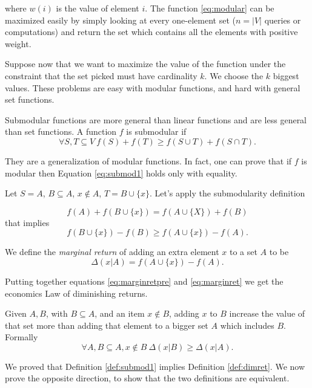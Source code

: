 where $w(i)$ is the value of element $i$. The function \ref{eq:modular} can be maximized easily by simply looking at every one-element set ($n = |V|$ queries or computations) and return the set which contains all the elements with positive weight.

Suppose now that we want to maximize the value of the function under the constraint that the set picked must have cardinality $k$. We choose the $k$ biggest values. These problems are easy with modular functions, and hard with general set functions.

\begin{defn}\label{def:submod1}
	Submodular functions are more general than linear functions and are less general than set functions. A function $f$ is submodular if
	\begin{equation}\label{eq:submod1}
	\forall S, T \subseteq V\ f(S) + f(T) \geq f(S \cup T) + f(S \cap T).
	\end{equation}
\end{defn}

They are a generalization of modular functions. In fact, one can prove that if $f$ is modular then Equation \ref{eq:submod1} holds only with equality.


Let $S = A$, $B \subseteq A$, $x \not\in A$, $T = B \cup \{x\}$. Let's apply the submodularity definition

\begin{equation}
f(A) + f(B \cup \{x\}) = f(A \cup \{X\}) + f(B)
\end{equation}
that implies
\begin{equation}\label{eq:marginretpre}
f(B \cup \{x\}) - f(B) \geq f(A \cup\{x\}) - f(A).
\end{equation}

\begin{defn}
	We define the \emph{marginal return} of adding an extra element $x$ to a set $A$ to be
	\begin{equation}\label{eq:marginret}
	\Delta(x|A) = f(A\cup\{x\}) - f(A).
	\end{equation}
\end{defn}

Putting together equations \ref{eq:marginretpre} and \ref{eq:marginret} we get the economics Law of diminishing returns.

\begin{defn}\label{def:dimret}
	Given $A, B$, with $B \subseteq A$, and an item $x \not\in B$, adding $x$ to $B$ increase the value of that set more than adding that element to a bigger set $A$ which includes $B$. Formally
	\begin{equation}
		\forall A, B \subseteq A, x\not\in B\ \Delta(x|B) \geq \Delta(x|A).
	\end{equation} 
\end{defn}

We proved that Definition \ref{def:submod1} implies Definition \ref{def:dimret}. We now prove the opposite direction, to show that the two definitions are equivalent.


